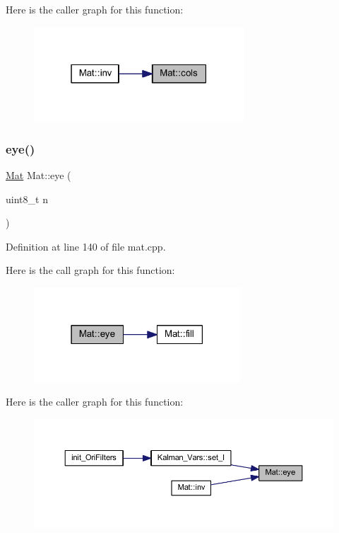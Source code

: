 Here is the caller graph for this function\+:
\nopagebreak
\begin{figure}[H]
\begin{center}
\leavevmode
\includegraphics[width=223pt]{class_mat_a88332d9cd088208e24bea1f10651d1e7_icgraph}
\end{center}
\end{figure}
\mbox{\label{class_mat_ab02af947644cba411f97e1459485b67d}} 
\subsubsection{\texorpdfstring{eye()}{eye()}}
{\footnotesize\ttfamily \mbox{\hyperlink{class_mat}{Mat}} Mat\+::eye (\begin{DoxyParamCaption}\item[{uint8\+\_\+t}]{n }\end{DoxyParamCaption})\hspace{0.3cm}{\ttfamily [static]}}



Definition at line 140 of file mat.\+cpp.

Here is the call graph for this function\+:
\nopagebreak
\begin{figure}[H]
\begin{center}
\leavevmode
\includegraphics[width=219pt]{class_mat_ab02af947644cba411f97e1459485b67d_cgraph}
\end{center}
\end{figure}
Here is the caller graph for this function\+:
\nopagebreak
\begin{figure}[H]
\begin{center}
\leavevmode
\includegraphics[width=350pt]{class_mat_ab02af947644cba411f97e1459485b67d_icgraph}
\end{center}
\end{figure}
\mbox{\label{class_mat_abadfedd9dc62cb060771a03ac40c7340}} 
